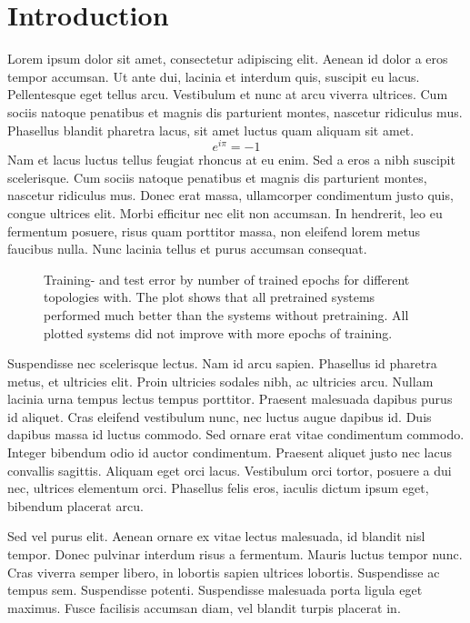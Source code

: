 
\section{Introduction}
Lorem ipsum dolor sit amet, consectetur adipiscing elit. Aenean id dolor a eros tempor accumsan. Ut ante dui, lacinia et interdum quis, suscipit eu lacus. Pellentesque eget tellus arcu. Vestibulum et nunc at arcu viverra ultrices. Cum sociis natoque penatibus et magnis dis parturient montes, nascetur ridiculus mus. Phasellus blandit pharetra lacus, sit amet luctus quam aliquam sit amet.
\[e^{i \pi}= -1\]
Nam et lacus luctus tellus feugiat rhoncus at eu enim. Sed a eros a nibh suscipit scelerisque. Cum sociis natoque penatibus et magnis dis parturient montes, nascetur ridiculus mus. Donec erat massa, ullamcorper condimentum justo quis, congue ultrices elit. Morbi efficitur nec elit non accumsan. In hendrerit, leo eu fermentum posuere, risus quam porttitor massa, non eleifend lorem metus faucibus nulla. Nunc lacinia tellus et purus accumsan consequat.

\begin{figure}[htb]
    \centering
    
    \caption{Training- and test error by number of trained epochs for different
             topologies with. The plot shows
             that all pretrained systems performed much better than the systems
             without pretraining. All plotted systems did not improve
             with more epochs of training.}
\label{fig:training-and-test-error-for-different-topologies-pretraining}
\end{figure}

Suspendisse nec scelerisque lectus. Nam id arcu sapien. Phasellus id pharetra metus, et ultricies elit. Proin ultricies sodales nibh, ac ultricies arcu. Nullam lacinia urna tempus lectus tempus porttitor. Praesent malesuada dapibus purus id aliquet. Cras eleifend vestibulum nunc, nec luctus augue dapibus id. Duis dapibus massa id luctus commodo. Sed ornare erat vitae condimentum commodo. Integer bibendum odio id auctor condimentum. Praesent aliquet justo nec lacus convallis sagittis. Aliquam eget orci lacus. Vestibulum orci tortor, posuere a dui nec, ultrices elementum orci. Phasellus felis eros, iaculis dictum ipsum eget, bibendum placerat arcu.

Sed vel purus elit. Aenean ornare ex vitae lectus malesuada, id blandit nisl tempor. Donec pulvinar interdum risus a fermentum. Mauris luctus tempor nunc. Cras viverra semper libero, in lobortis sapien ultrices lobortis. Suspendisse ac tempus sem. Suspendisse potenti. Suspendisse malesuada porta ligula eget maximus. Fusce facilisis accumsan diam, vel blandit turpis placerat in.
